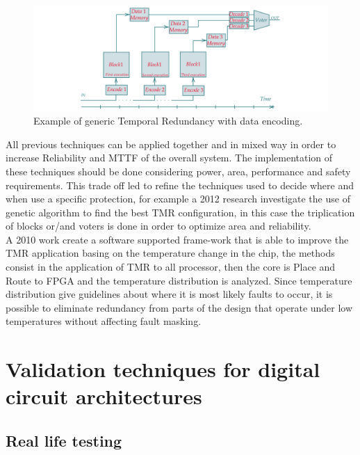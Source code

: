{{{    		
			\begin{figure}[H]
    			\centering
    			\includegraphics[scale=0.2,center]{./images/TimeRedundancy2.png}
    			\caption{Example of generic Temporal Redundancy with data encoding.}
    			\label{fig:TemporalRedundancy2}
    		\end{figure} 
			
			
		}
	
	
	    All previous techniques can be applied together and in mixed way in order to increase Reliability and MTTF of the overall system. 
	    The implementation of these techniques should be done considering power, area, performance and safety requirements. 
	    This trade off led to refine the techniques used to decide where and when use a specific protection, for example a 2012 research   investigate the use of genetic algorithm to find the best TMR configuration, in this case the triplication of blocks or/and voters is done in order to optimize area and reliability. \\
	    
	    A 2010 work create a software supported frame-work that is able to improve the TMR application basing on the temperature change in the chip, the methods consist in the application of TMR to all processor, then the core is Place and Route to FPGA and the temperature distribution is analyzed. Since temperature distribution give guidelines about where it is most likely faults to occur, it is possible to eliminate redundancy from parts of the design that operate under low temperatures without affecting fault masking. 
	    
	    
	} %
	\section{Validation techniques for digital circuit architectures}{
		\subsection{Real life testing}{
			
}}}

